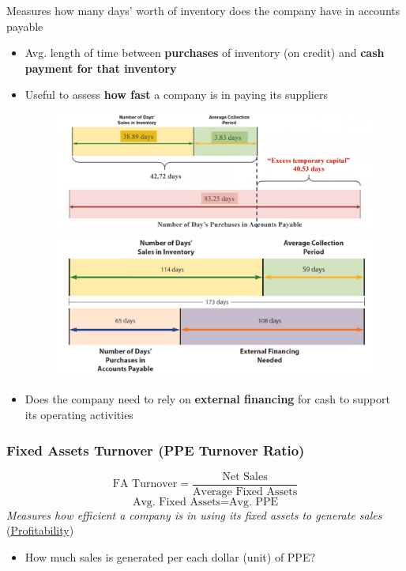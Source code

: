 \documentclass{article}
\begin{document}
\begin{multicols}{2}
Measures how many days' worth of inventory does the company have in accounts payable
\begin{itemize}
	\item Avg. length of time between \textbf{purchases} of inventory (on credit) and \textbf{cash payment for that inventory}
	\item Useful to assess \textbf{how fast} a company is in paying its suppliers
	\begin{figure}[H]
		\centering
		\includegraphics[width=\columnwidth]{image/operating_cycle.png}
		\includegraphics[width=\columnwidth]{image/caterpillar_opcycle.png}
	\end{figure}
	\item Does the company need to rely on \textbf{external financing} for cash to support its operating activities
\end{itemize}

\subsubsection{Fixed Assets Turnover (PPE Turnover Ratio)}
$$\text{FA Turnover} = \frac{\text{Net Sales}}{\text{Average Fixed Assets}}$$
$$\text{Avg. Fixed Assets} = \text{Avg. PPE}$$
\textit{Measures how efficient a company is in using its fixed assets to generate sales} (\underline{Profitability})
\begin{itemize}
	\item How much sales is generated per each dollar (unit) of PPE?
\end{itemize}


\end{multicols}
\end{document}
